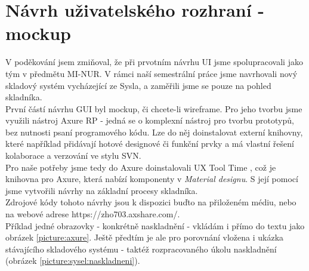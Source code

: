 \section{Návrh uživatelského rozhraní - mockup}

V poděkování jsem zmiňoval, že při prvotním návrhu UI jsme spolupracovali jako tým v předmětu MI-NUR. V rámci naší semestrální práce jsme navrhovali nový skladový systém vycházející ze Sysla, a zaměřili jsme se pouze na pohled skladníka.\\
První částí návrhu GUI byl mockup, či chcete-li wireframe. Pro jeho tvorbu jsme využili nástroj Axure RP \cite{axure} - jedná se o komplexní nástroj pro tvorbu prototypů, bez nutnosti psaní programového kódu. Lze do něj doinstalovat externí knihovny, které například přidávají hotové designové či funkční prvky a má vlastní řešení kolaborace a verzování ve stylu SVN.\\
Pro naše potřeby jsme tedy do Axure doinstalovali UX Tool Time \cite{uxtooltime}, což je knihovna pro Axure, která nabízí komponenty v \emph{Material designu}. S její pomocí jsme vytvořili návrhy na základní procesy skladníka.\\
Zdrojové kódy tohoto návrhy jsou k dispozici buďto na přiloženém médiu, nebo na webové adrese https://zho703.axshare.com/.\\
Příklad jedné obrazovky - konkrétně naskladnění - vkládám i přímo do textu jako obrázek \ref{picture:axure}. Ještě předtím je ale pro porovnání vložena i ukázka stávajícího skladového systému - taktéž rozpracovaného úkolu naskladnění (obrázek \ref{picture:sysel:naskladneni}).

